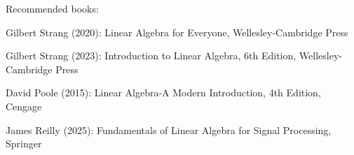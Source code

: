 \documentclass[a4paper, 11pt]{scrartcl}
\begin{document}
\vspace{2em}

\noindent Recommended books:

Gilbert Strang (2020): Linear Algebra for Everyone, Wellesley-Cambridge Press

Gilbert Strang (2023): Introduction to Linear Algebra, 6th Edition, Wellesley-Cambridge Press

David Poole (2015): Linear Algebra-A Modern Introduction, 4th Edition, Cengage

James Reilly (2025): Fundamentals of Linear Algebra for Signal Processing, Springer
\end{document}
